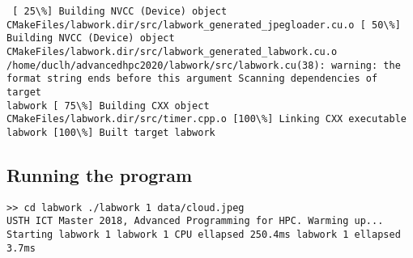 \documentclass{article} \usepackage[utf8]{inputenc}
\begin{document}
\scriptsize \begin{verbatim} [ 25\%] Building NVCC (Device) object 
CMakeFiles/labwork.dir/src/labwork_generated_jpegloader.cu.o [ 50\%] 
Building NVCC (Device) object 
CMakeFiles/labwork.dir/src/labwork_generated_labwork.cu.o 
/home/duclh/advancedhpc2020/labwork/src/labwork.cu(38): warning: the 
format string ends before this argument Scanning dependencies of target 
labwork [ 75\%] Building CXX object 
CMakeFiles/labwork.dir/src/timer.cpp.o [100\%] Linking CXX executable 
labwork [100\%] Built target labwork \end{verbatim} \subsection{Running 
the program} \small \begin{verbatim}
>> cd labwork ./labwork 1 data/cloud.jpeg
USTH ICT Master 2018, Advanced Programming for HPC. Warming up... 
Starting labwork 1 labwork 1 CPU ellapsed 250.4ms labwork 1 ellapsed 
3.7ms \end{verbatim} 
\end{document}
